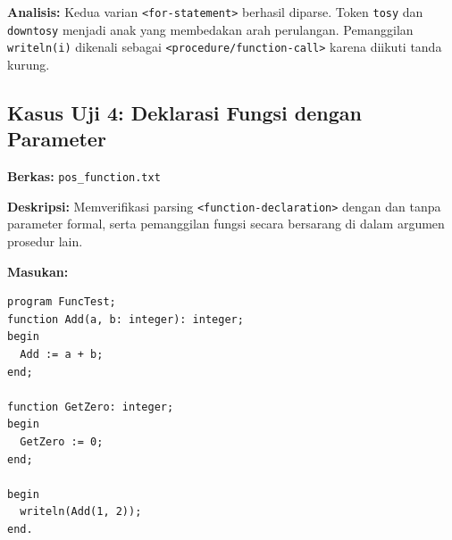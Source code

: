 \documentclass[12pt,a4paper]{article}
\begin{document}
\textbf{Analisis:} Kedua varian \texttt{<for-statement>} berhasil diparse. Token \texttt{tosy} dan \texttt{downtosy} menjadi anak yang membedakan arah perulangan. Pemanggilan \texttt{writeln(i)} dikenali sebagai \texttt{<procedure/function-call>} karena diikuti tanda kurung.

\subsection{Kasus Uji 4: Deklarasi Fungsi dengan Parameter}
\textbf{Berkas:} \texttt{pos\_function.txt}

\textbf{Deskripsi:} Memverifikasi parsing \texttt{<function-declaration>} dengan dan tanpa parameter formal, serta pemanggilan fungsi secara bersarang di dalam argumen prosedur lain.

\textbf{Masukan:}
\begin{lstlisting}[style=default]
program FuncTest;
function Add(a, b: integer): integer;
begin
  Add := a + b;
end;

function GetZero: integer;
begin
  GetZero := 0;
end;

begin
  writeln(Add(1, 2));
end.
\end{lstlisting}
\end{document}
